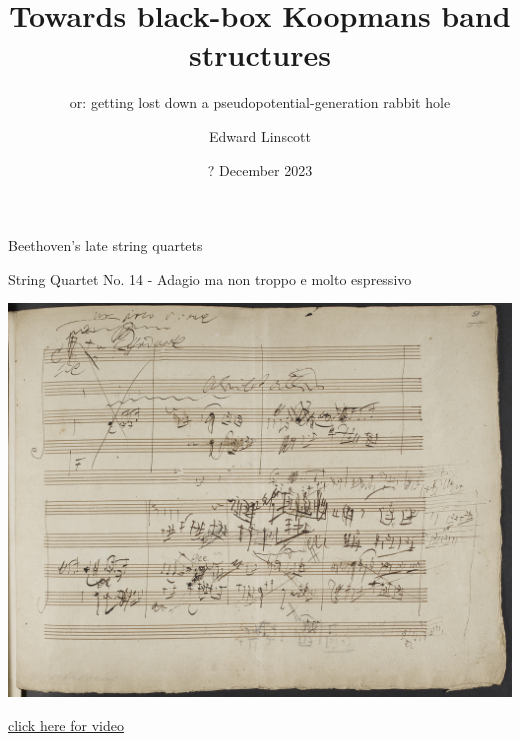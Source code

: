 \documentclass[xcolor=table,aspectratio=169]{beamer}
\author{Edward Linscott}
\institute{PSI}
\date{? December 2023}
\title{Towards black-box Koopmans band structures}
\subtitle{or: getting lost down a pseudopotential-generation rabbit hole}
\numberwithin{equation}{section}
\begin{document}
\begin{frame}{Beethoven's late string quartets}
    \centering

    String Quartet No. 14 - Adagio ma non troppo e molto espressivo

    \vspace{6pt}

    \includegraphics[height=0.6\paperheight]{photos/beethoven.jpg}

    {\tiny \href{https://www.youtube.com/watch?v=JE_crvhG3Co\&t=454s\&ab_channel=DavidSukonick\#t=4m27s}{click here for video}}



\end{frame}

\frame{\titlepage}
\end{document}
